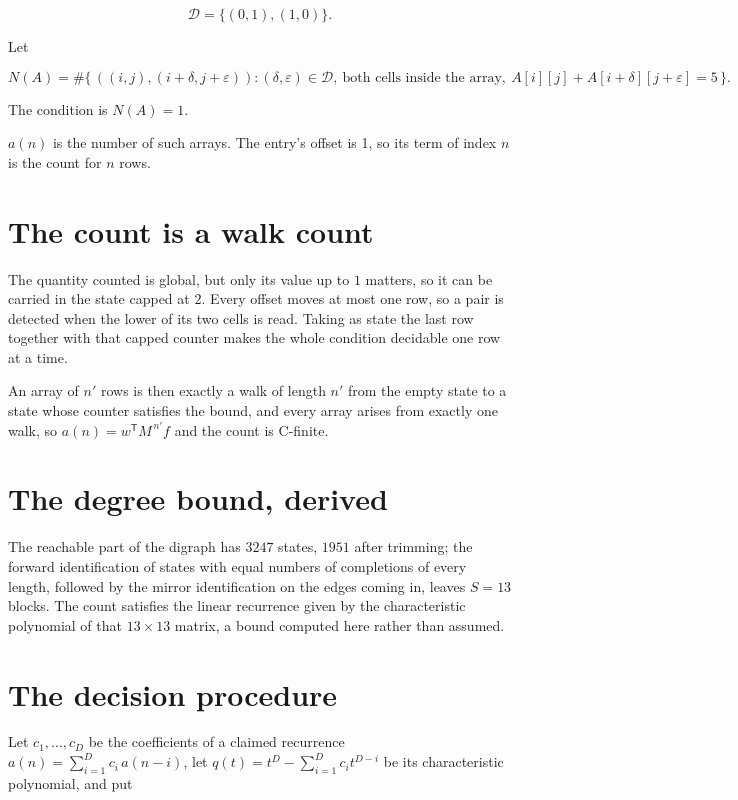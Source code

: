 \documentclass[11pt]{article}
\theoremstyle{definition}
\begin{document}
\[\mathcal{D} = \{(0,1), (1,0)\}.\]

Let

\[N(A) = \#\bigl\{\,((i,j),(i{+}\delta,j{+}\varepsilon)) : (\delta,\varepsilon) \in \mathcal{D},\ \text{both cells inside the array},\ A[i][j] + A[i{+}\delta][j{+}\varepsilon] = 5\,\bigr\}.\]

The condition is $N(A) = 1$.

$a(n)$ is the number of such arrays. The entry's offset is 1, so its term of index $n$ is the count for $n$ rows.

\section{The count is a walk count}

The quantity counted is global, but only its value up to $1$ matters, so it can be carried in the state capped at $2$. Every offset moves at most one row, so a pair is detected when the lower of its two cells is read. Taking as state the last row together with that capped counter makes the whole condition decidable one row at a time.

An array of $n'$ rows is then exactly a walk of length $n'$ from the empty state to a state whose counter satisfies the bound, and every array arises from exactly one walk, so $a(n) = w^{\mathsf T}M^{\,n'}f$ and the count is C-finite.

\section{The degree bound, derived}

The reachable part of the digraph has $3247$ states, $1951$ after trimming; the forward identification of states with equal numbers of completions of every length, followed by the mirror identification on the edges coming in, leaves $S = 13$ blocks. The count satisfies the linear recurrence given by the characteristic polynomial of that $13\times13$ matrix, a bound computed here rather than assumed.

\section{The decision procedure}

Let $c_1,\dots,c_D$ be the coefficients of a claimed recurrence $a(n) = \sum_{i=1}^{D} c_i\,a(n-i)$, let $q(t) = t^{D} - \sum_{i=1}^{D} c_i t^{D-i}$ be its characteristic polynomial, and put
\end{document}
